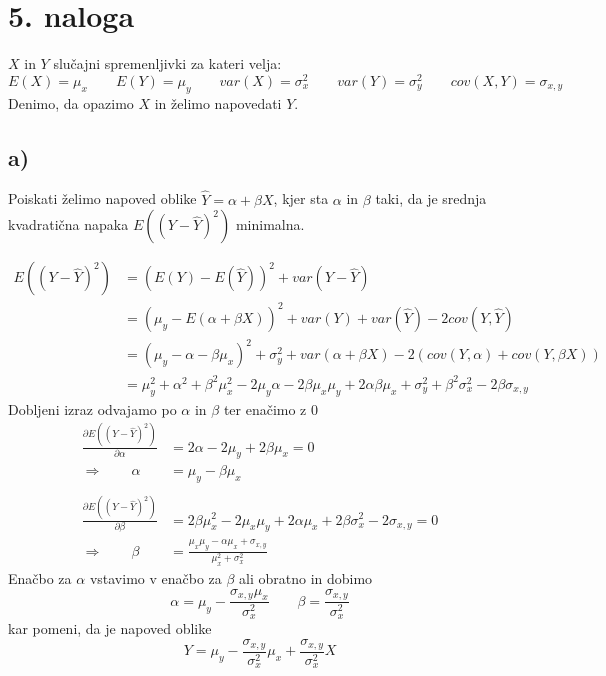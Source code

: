 \documentclass[A4paper, 11pt]{article}
\begin{document}

\section*{5. naloga}
$X$ in $Y$ slučajni spremenljivki za kateri velja:
\[ E(X) = \mu_x \qquad E(Y) = \mu_y \qquad var(X) = \sigma_x^2 \qquad var(Y) = \sigma_y^2 \qquad cov(X,Y) = \sigma_{x,y} \]
Denimo, da opazimo $X$ in želimo napovedati $Y$.

\subsection*{a)}
Poiskati želimo napoved oblike $\hat{Y} = \alpha + \beta X$, kjer sta $\alpha$ in $\beta$ taki, da je srednja kvadratična napaka $E( (Y - \hat{Y})^2 )$ minimalna. 

\[
\begin{split}
E( (Y - \hat{Y})^2 ) & = (E(Y) - E(\hat{Y}) )^2 + var(Y - \hat{Y}) \\
                                    & = ( \mu_y - E(\alpha + \beta X) )^2 + var(Y) + var(\hat{Y}) - 2cov(Y,\hat{Y}) \\
                                    & = ( \mu_y - \alpha - \beta \mu_x) ^2 + \sigma_y^2 + var(\alpha + \beta X) - 2(cov(Y, \alpha) + cov(Y,\beta X)) \\
                                    & = \mu_y^2 + \alpha^2 + \beta^2 \mu_x^2 - 2 \mu_y \alpha - 2 \beta \mu_x \mu_y + 2 \alpha \beta \mu_x + \sigma_y^2 + \beta^2 \sigma_x^2 - 2 \beta \sigma_{x,y}
\end{split}
\]
Dobljeni izraz odvajamo po $\alpha$ in $\beta$ ter enačimo z 0
\[
\begin{split}
\frac{\partial E( (Y - \hat{Y})^2 )}{\partial \alpha} & = 2 \alpha - 2 \mu_y + 2 \beta \mu_x = 0 \\
\Rightarrow \qquad                                       \alpha & = \mu_y - \beta \mu_x \\
\\
\frac{\partial E( (Y - \hat{Y})^2 )}{\partial \beta} & = 2 \beta \mu_x^2 - 2 \mu_x \mu_y + 2 \alpha \mu_x + 2 \beta \sigma_x^2 - 2 \sigma_{x,y} = 0 \\
\Rightarrow \qquad                                       \beta & = \frac{\mu_x \mu_y - \alpha \mu_x + \sigma_{x,y}}{\mu_x^2 + \sigma_x^2}
\end{split}
\]
Enačbo za $\alpha$ vstavimo v enačbo za $\beta$ ali obratno in dobimo
\[ \alpha = \mu_y - \frac{\sigma_{x,y} \mu_x}{\sigma_x^2} \qquad \beta = \frac{\sigma_{x,y}}{\sigma_x^2} \]
kar pomeni, da je napoved oblike
\[ Y = \mu_y - \frac{\sigma_{x,y}}{\sigma_x^2} \mu_x + \frac{\sigma_{x,y}}{\sigma_x^2} X  \]
\end{document}
